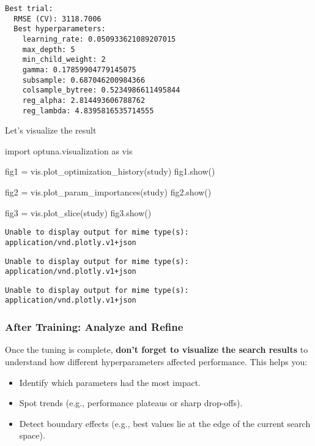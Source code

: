 \documentclass[
  letterpaper,
  DIV=11,
  numbers=noendperiod]{scrreprt}
\newenvironment{Shaded}{\begin{snugshade}}{\end{snugshade}}
\newcommand{\ImportTok}[1]{\textcolor[rgb]{0.00,0.46,0.62}{#1}}
\newcommand{\NormalTok}[1]{\textcolor[rgb]{0.00,0.23,0.31}{#1}}
\newcommand{\OperatorTok}[1]{\textcolor[rgb]{0.37,0.37,0.37}{#1}}
\providecommand{\tightlist}{%
  \setlength{\itemsep}{0pt}\setlength{\parskip}{0pt}}\usepackage{longtable,booktabs,array}
\begin{document}
\begin{verbatim}
Best trial:
  RMSE (CV): 3118.7006
  Best hyperparameters:
    learning_rate: 0.050933621089207015
    max_depth: 5
    min_child_weight: 2
    gamma: 0.17859904779145075
    subsample: 0.687046200984366
    colsample_bytree: 0.5234986611495844
    reg_alpha: 2.814493606788762
    reg_lambda: 4.8395816535714555
\end{verbatim}

Let's visualize the result

\begin{Shaded}
\begin{Highlighting}[]
\ImportTok{import}\NormalTok{ optuna.visualization }\ImportTok{as}\NormalTok{ vis}

\NormalTok{fig1 }\OperatorTok{=}\NormalTok{ vis.plot\_optimization\_history(study)}
\NormalTok{fig1.show()}
    
\NormalTok{fig2 }\OperatorTok{=}\NormalTok{ vis.plot\_param\_importances(study)}
\NormalTok{fig2.show()}

\NormalTok{fig3 }\OperatorTok{=}\NormalTok{ vis.plot\_slice(study)}
\NormalTok{fig3.show()}
    
\end{Highlighting}
\end{Shaded}

\begin{verbatim}
Unable to display output for mime type(s): application/vnd.plotly.v1+json
\end{verbatim}

\begin{verbatim}
Unable to display output for mime type(s): application/vnd.plotly.v1+json
\end{verbatim}

\begin{verbatim}
Unable to display output for mime type(s): application/vnd.plotly.v1+json
\end{verbatim}

\subsubsection{After Training: Analyze and
Refine}\label{after-training-analyze-and-refine}

Once the tuning is complete, \textbf{don't forget to visualize the
search results} to understand how different hyperparameters affected
performance. This helps you:

\begin{itemize}
\tightlist
\item
  Identify which parameters had the most impact.
\item
  Spot trends (e.g., performance plateaus or sharp drop-offs).
\item
  Detect boundary effects (e.g., best values lie at the edge of the
  current search space).
\end{itemize}
\end{document}
